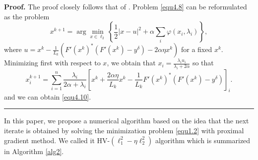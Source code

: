 \documentclass[a4paper,12pt]{article}
\numberwithin{equation}{section}
\newenvironment{proof}[1][Proof]{\textbf{#1.} }
{\ \rule{0.75em}{0.75em}\smallskip}
\begin{document}
\begin{proof}
    The proof closely follows that of \cite[Lemma 6.70]{B17}. Problem \eqref{equ4.8} can be reformulated as the problem
    \begin{equation}\label{equ4.10}
        x^{k+1}=\arg\min_{x\in \ell_{2}}\left\{\frac{1}{2}\left|x-u\right|^{2}+\alpha\sum_{i}\varphi(x_{i}, \lambda_{i})\right\},
    \end{equation}
    where $u=x^{k}-\frac{1}{L_{k}}\left(F'\left(x^{k}\right)^{*} \left(F'\left(x^{k}\right)-y^{\delta}\right)-2\alpha\eta x^{k}\right)$ for a fixed $x^{k}$. Minimizing first with respect to $x$, we obtain that $x_{i}=\frac{\lambda_{i}u_{i}}{\lambda_{i}+2\alpha}$ so that
    \begin{equation*}
        x^{k+1}_{i}=\sum_{i=1}^{n}\frac{\lambda_{i}}{2\alpha+\lambda_{i}}\left[x^{k}+\frac{2\alpha\eta}{L_{k}} x^{k}-\frac{1}{L_{k}}F'\left(x^{k}\right)^{*} \left(F'\left(x^{k}\right)-y^{\delta}\right)\right]_{i}.
    \end{equation*}
    and we can obtain \eqref{equ4.10}.
\end{proof}

\par In this paper, we propose a numerical algorithm based on the idea that the next iterate is obtained by solving the minimization problem \eqref{equ1.2} with proximal gradient method. We called it HV-$\left(\ell_{1}^{2}-\eta\ell_{2}^{2}\right)$ algorithm which is summarized in Algorithm \ref{alg2}.

\begin{algorithm}
\caption{HV-($\ell_{1}^{2}-\eta\ell_{2}^{2}$) algorithm for problem \eqref{equ1.2}}
\begin{algorithmic}\label{alg2}
\end{algorithmic}
\end{algorithm}
\end{document}
